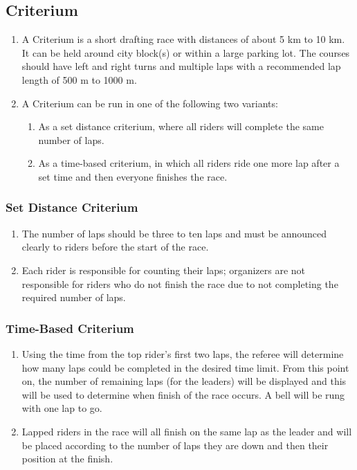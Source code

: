 \subsection{Criterium}
	\begin{enumerate}[leftmargin=1.5em,labelsep=*]
		\item A Criterium is a short drafting race with distances of about 5 km to 10 km.
		It can be held around city block(s) or within a large parking lot.
		The courses should have left and right turns and multiple laps with a recommended lap length of 500 m to 1000 m.
		\item A Criterium can be run in one of the following two variants:
		\begin{enumerate}[label*=\arabic*,leftmargin=1.5em,labelsep=*]
			\item As a set distance criterium, where all riders will complete the same number of laps.
			\item As a time-based criterium, in which all riders ride one more lap after a set time and then everyone finishes the race.
		\end{enumerate}
	\end{enumerate}
	
\subsubsection{Set Distance Criterium}
	\begin{enumerate}[leftmargin=1.5em,labelsep=*]
		\item The number of laps should be three to ten laps and must be announced clearly to riders before the start of the race.
		\item Each rider is responsible for counting their laps; organizers are not responsible for riders who do not finish the race due to not completing the required number of laps.
	\end{enumerate}

\subsubsection{Time-Based Criterium}
	\begin{enumerate}[leftmargin=1.5em,labelsep=*]
		\item Using the time from the top rider's first two laps, the referee will determine how many laps could be completed in the desired time limit.
		From this point on, the number of remaining laps (for the leaders) will be displayed and this will be used to determine when finish of the race occurs.
		A bell will be rung with one lap to go.
		\item Lapped riders in the race will all finish on the same lap as the leader and will be placed according to the number of 
        laps they are down and then their position at the finish.
	\end{enumerate}

